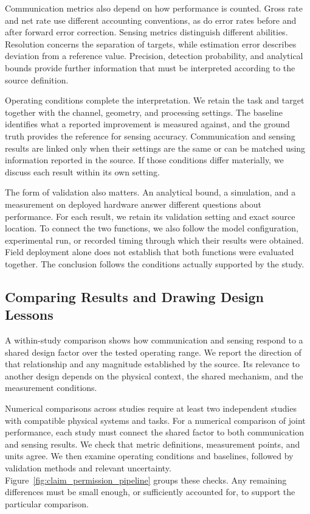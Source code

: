 Communication metrics also depend on how performance is counted. Gross rate
and net rate use different accounting conventions, as do error rates before
and after forward error correction. Sensing metrics distinguish different
abilities. Resolution concerns the separation of targets, while estimation
error describes deviation from a reference value. Precision, detection
probability, and analytical bounds provide further information that must be
interpreted according to the source definition.

Operating conditions complete the interpretation. We retain the task and
target together with the channel, geometry, and processing settings.
The baseline identifies what a reported improvement is measured against, and
the ground truth provides the reference for sensing accuracy. Communication
and sensing results are linked only when their settings are the same or can
be matched using information reported in the source. If those conditions
differ materially, we discuss each
result within its own setting.

The form of validation also matters. An analytical bound, a simulation, and a
measurement on deployed hardware answer different questions about performance.
For each result, we retain its validation setting and exact source location.
To connect the two functions, we also follow the model configuration,
experimental run, or recorded timing through which their results were obtained.
Field deployment alone does not establish that both functions were evaluated
together. The conclusion follows the conditions actually supported by the
study.

\subsection{Comparing Results and Drawing Design Lessons}

A within-study comparison shows how communication and sensing respond to a
shared design factor over the tested operating range. We report the direction
of that relationship and any magnitude established by the source. Its
relevance to another design depends on the physical context, the shared
mechanism, and the measurement conditions.

Numerical comparisons across studies require at least two independent studies
with compatible physical systems and tasks. For a numerical comparison of
joint performance, each study must connect the shared factor to both
communication and sensing results. We check that metric definitions,
measurement points, and units agree. We then examine operating conditions and
baselines, followed by validation methods and relevant uncertainty.
Figure~\ref{fig:claim_permission_pipeline} groups these checks.
Any remaining differences must be small enough, or sufficiently accounted
for, to support the particular comparison.

